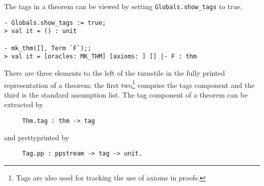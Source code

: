 The tags in a theorem can be viewed by setting \verb+Globals.show_tags+ to
true.

\setcounter{sessioncount}{1}
\begin{session}\begin{verbatim}
- Globals.show_tags := true;
> val it = () : unit

- mk_thm([], Term `F`);;
> val it = [oracles: MK_THM] [axioms: ] [] |- F : thm
\end{verbatim}\end{session}

There are three elements to the left of the turnstile in the fully printed
representation of a theorem: the first two\footnote{Tags are also used for
tracking the use of axioms in proofs.} comprise the tags component and the
third is the standard assumption list. The tag component of a theorem
can be extracted by

\begin{boxed} \begin{verbatim}
     Thm.tag : thm -> tag
\end{verbatim}\end{boxed}

\noindent and prettyprinted by

\begin{boxed} \begin{verbatim}
     Tag.pp : ppstream -> tag -> unit.
\end{verbatim}\end{boxed}


